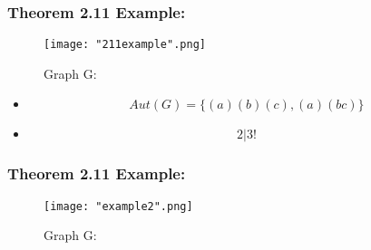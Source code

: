 \documentclass{beamer}
\begin{document}
\begin{frame}
\frametitle{Theorem 2.11 Example:}
\begin{center}
		\begin{figure}[H]
		\caption{Graph G:}
		\centering
		\texttt{[image: "211example".png]}
		\end{figure}
\begin{itemize}
\item\begin{equation*}
	Aut(G) = \{(a)(b)(c), (a)(bc)\}
	\end{equation*}
\vfill
\item \begin{equation*}
	2 \bigl\vert 3!
	\end{equation*}
\end{itemize}
\end{center}
\end{frame}

\begin{frame}
\frametitle{Theorem 2.11 Example:}
\begin{center}
		\begin{figure}[H]
		\caption{Graph G:}
		\centering
		\texttt{[image: "example2".png]}
		\end{figure}
\end{center}
\end{frame}
\end{document}
